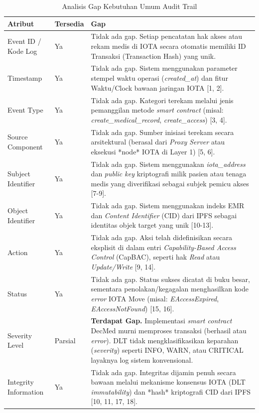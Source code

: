 \begin{table}[htbp]
    \centering
    \vspace{0.25cm}
    \caption{Analisis Gap Kebutuhan Umum Audit Trail}
    \label{tab:analisis-gap-kebutuhan-umum-audit-trail}
    \begin{tabular}{|p{2.5cm}|p{1.5cm}|p{10cm}|}
        \hline
        \textbf{Atribut} & \textbf{Tersedia} & \textbf{Gap} \\
        \hline
        Event ID / Kode Log & Ya & Tidak ada gap. Setiap pencatatan hak akses atau rekam medis di IOTA secara otomatis memiliki ID Transaksi (Transaction Hash) yang unik. \\
        \hline
        Timestamp & Ya & Tidak ada gap. Sistem menggunakan parameter stempel waktu operasi (\textit{created\_at}) dan fitur Waktu/Clock bawaan jaringan IOTA [1, 2]. \\
        \hline
        Event Type & Ya & Tidak ada gap. Kategori terekam melalui jenis pemanggilan metode \textit{smart contract} (misal: \textit{create\_medical\_record}, \textit{create\_access}) [3, 4]. \\
        \hline
        Source Component & Ya & Tidak ada gap. Sumber inisiasi terekam secara arsitektural (berasal dari \textit{Proxy Server} atau eksekusi *node* IOTA di Layer 1) [5, 6]. \\
        \hline
        Subject Identifier & Ya & Tidak ada gap. Sistem menggunakan \textit{iota\_address} dan \textit{public key} kriptografi milik pasien atau tenaga medis yang diverifikasi sebagai subjek pemicu akses [7-9]. \\
        \hline
        Object Identifier & Ya & Tidak ada gap. Sistem menggunakan indeks EMR dan \textit{Content Identifier} (CID) dari IPFS sebagai identitas objek target yang unik [10-13]. \\
        \hline
        Action & Ya & Tidak ada gap. Aksi telah didefinisikan secara eksplisit di dalam entri \textit{Capability-Based Access Control} (CapBAC), seperti hak \textit{Read} atau \textit{Update/Write} [9, 14]. \\
        \hline
        Status & Ya & Tidak ada gap. Status sukses dicatat di buku besar, sementara penolakan/kegagalan menghasilkan kode \textit{error} IOTA Move (misal: \textit{EAccessExpired}, \textit{EAccessNotFound}) [15, 16]. \\
        \hline
        Severity Level & Parsial & \textbf{Terdapat Gap.} Implementasi \textit{smart contract} DecMed murni memproses transaksi (berhasil atau \textit{error}). DLT tidak mengklasifikasikan keparahan (\textit{severity}) seperti INFO, WARN, atau CRITICAL layaknya log sistem konvensional. \\
        \hline
        Integrity Information & Ya & Tidak ada gap. Integritas dijamin penuh secara bawaan melalui mekanisme konsensus IOTA (DLT \textit{immutability}) dan *hash* kriptografi CID dari IPFS [10, 11, 17, 18]. \\
        \hline
    \end{tabular}
\end{table}

